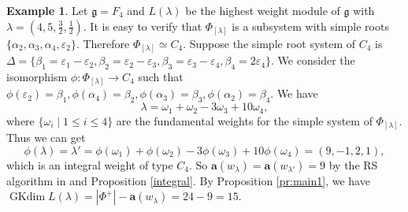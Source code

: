 \documentclass[reqno,12pt]{amsart}
\numberwithin{equation}{section}
\theoremstyle{plain}
\theoremstyle{definition}
\newtheorem{ex}[Thm]{Example}
\newcommand{\lam}{\lambda}
\newcommand{\ep}{\varepsilon}
\newcommand{\Ann}{\mathrm{Ann}}
\newcommand{\aff}{ \mathbf{a} }
\newcommand{\gkd}{\operatorname{GKdim}}
\renewcommand{\leq}{\leqslant}
\begin{document}
       
     

\begin{ex}\label{exf4}
	Let $\mathfrak{g}=F_4$ and $L(\lam)$ be the highest weight module of $\mathfrak{g}$ with  $\lambda=(4, 5, \frac{3}{2}, \frac{1}{2})$. It is easy to verify that $\Phi_{[\lambda]}$ is a subsystem with simple roots $\{\alpha_2, \alpha_3, \alpha_4, \ep_2\}$. Therefore $\Phi_{[\lambda]}\simeq C_4$. Suppose the simple root system of $C_4$ is $\Delta=\{\beta_1=\ep_1-\ep_2, \beta_2=\ep_2-\ep_3, \beta_3=\ep_3-\ep_4,\beta_4=2\ep_4\}$. We consider the isomorphism $\phi: \Phi_{[\lambda]} \rightarrow C_4$ such that $\phi(\varepsilon_2)=\beta_1, \phi(\alpha_4)=\beta_2, \phi(\alpha_3)=\beta_3, \phi(\alpha_2)=\beta_4$. We have 
 $$\lambda=\omega_1+\omega_2-3\omega_3+10\omega_{4},$$
 where $\{\omega_i\mid 1\leq i\leq 4\}$ are the fundamental weights for the simple system of $\Phi_{[\lambda]}$. Thus we can get  
 $$\phi(\lam)=\lambda'=\phi(\omega_1)+\phi(\omega_2)-3\phi(\omega_3)+10\phi(\omega_{4})=(9,-1,2,1),$$ which is an integral weight of type $C_4$. So $\aff(w_{\lambda})=\aff(w_{\lambda'})=9$ by the RS algorithm in \cite{BXX} and Proposition \ref{integral}.
 By Proposition \ref{pr:main1},  we have $\gkd L(\lambda)=|\Phi^+|-\aff(w_{\lambda})=24-9=15$.

\end{ex}
 
\end{document}
